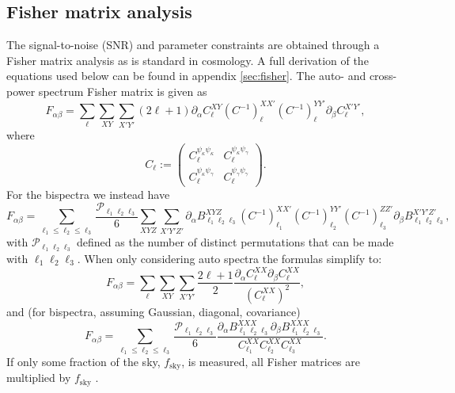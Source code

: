 \documentclass[11pt]{article} %
\begin{document}
\subsection{Fisher matrix analysis}
The signal-to-noise (SNR) and parameter constraints are obtained through a Fisher matrix analysis as is standard in cosmology\cite{dodelson2020modern}. A full derivation of the equations used below can be found in appendix \ref{sec:fisher}. The auto- and cross- power spectrum Fisher matrix is given as
\begin{equation*}
    F_{\alpha\beta} = \sum_{\ell} \sum_{XY}\sum_{X'Y'}(2\ell+1)\partial_\alpha C_\ell^{XY} (C^{-1})_\ell^{XX'}(C^{-1})_\ell^{YY'} \partial_\beta C^{X'Y'}_\ell,
\end{equation*}
where
\begin{equation*}
    C_{\ell} := \begin{pmatrix}
        C^{\psi_\kappa\psi_\kappa}_\ell & C^{\psi_\kappa\psi_\gamma}_\ell \\
        C^{\psi_\kappa\psi_\gamma}_\ell & C^{\psi_\gamma\psi_\gamma}_\ell
    \end{pmatrix}.
\end{equation*}
For the bispectra we instead have 
\begin{equation*}
    F_{\alpha\beta} = \sum_{\ell_1 \leq \ell_2 \leq \ell_3} \frac{\mathcal P _{\ell_1\ell_2\ell_3}}{6}
    \sum_{XYZ}\sum_{X'Y'Z'} 
    \partial_\alpha B^{X Y Z}_{\ell_1 \ell_2 \ell_3} 
    (C^{-1})^{X X'}_{\ell_1}
    (C^{-1})^{Y Y'}_{\ell_2}
    (C^{-1})^{Z Z'}_{\ell_3}
    \partial_\beta B^{X' Y' Z'}_{\ell_1 \ell_2 \ell_3},
\end{equation*}
with $\mathcal P_{\ell_1\ell_2\ell_3}$ defined as the number of distinct permutations that can be made with $\ell_1\ell_2\ell_3$. When only considering auto spectra the formulas simplify to:
\begin{equation*}
    F_{\alpha\beta} = \sum_{\ell} \sum_{XY}\sum_{X'Y'}\frac{2\ell+1}{2}\frac{\partial_{\alpha}C_\ell^{XX} \partial_\beta C^{XX}_\ell}{(C_\ell^{XX})^2},
\end{equation*}
and (for bispectra, assuming Gaussian, diagonal, covariance)
\begin{equation*}
    F_{\alpha\beta} = \sum_{\ell_1 \leq \ell_2 \leq \ell_3} \frac{\mathcal P _{\ell_1\ell_2\ell_3}}{6}
    \frac{\partial_\alpha B^{X X X}_{\ell_1 \ell_2 \ell_3} 
    \partial_\beta B^{XXX}_{\ell_1 \ell_2 \ell_3}}{C^{XX}_{\ell_1}C^{XX}_{\ell_2}C^{XX}_{\ell_3}}.
\end{equation*}
If only some fraction of the sky, $f_{\text{sky}}$, is measured, all Fisher matrices are multiplied by $f_{\text{sky}}$ \cite{Takada2003}.
\end{document}
